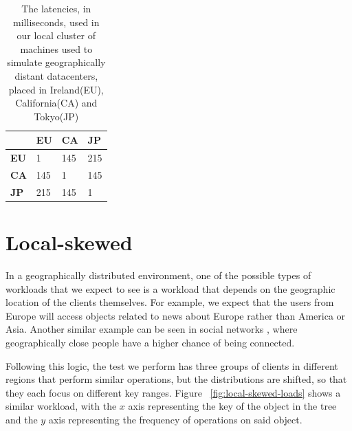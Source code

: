 \begin{table}[!htb]
  \centering
  \begin{tabular}{l l l l}
    \hline
    & \textbf{EU} & \textbf{CA} & \textbf{JP} \\
    \hline
    \textbf{EU} & 1 & 145 & 215 \\
    \textbf{CA} & 145 & 1 & 145 \\
    \textbf{JP} & 215 & 145 & 1 \\
    \hline
  \end{tabular}
  \caption{The latencies, in milliseconds, used in our local cluster of machines used to simulate geographically distant datacenters, placed in Ireland(EU), California(CA) and Tokyo(JP)}\label{tab:latencies}
\end{table}


\section{Local-skewed}\label{sec:local-skewed}
In a geographically distributed environment, one of the possible types of workloads that we expect to see is a workload that depends on the geographic location of the clients themselves. For example, we expect that the users from Europe will access objects related to news about Europe rather than America or Asia. Another similar example can be seen in social networks \citep{social}, where geographically close people have a higher chance of being connected.

Following this logic, the test we perform has three groups of clients in different regions that perform similar operations, but the distributions are shifted, so that they each focus on different key ranges. Figure ~\ref{fig:local-skewed-loads} shows a similar workload, with the $x$ axis representing the key of the object in the tree and the $y$ axis representing the frequency of operations on said object.

